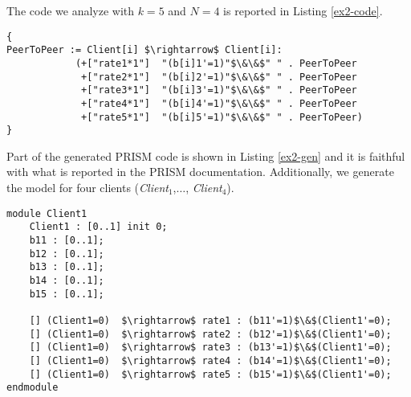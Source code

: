 The code we analyze with $k=5$ and $N=4$ is reported in Listing \ref{ex2-code}.
\begin{lstlisting}[style=chor-color,caption={Choreography for the Peer-To-Peer Protocol.},captionpos=b,label={ex2-code}]
{
PeerToPeer := Client[i] $\rightarrow$ Client[i]: 
			(+["rate1*1"]  "(b[i]1'=1)"$\&\&$" " . PeerToPeer
			 +["rate2*1"]  "(b[i]2'=1)"$\&\&$" " . PeerToPeer
			 +["rate3*1"]  "(b[i]3'=1)"$\&\&$" " . PeerToPeer
			 +["rate4*1"]  "(b[i]4'=1)"$\&\&$" " . PeerToPeer
			 +["rate5*1"]  "(b[i]5'=1)"$\&\&$" " . PeerToPeer)
}
\end{lstlisting} 

Part of the generated PRISM code is shown in Listing \ref{ex2-gen} and it is faithful with what is reported in the PRISM documentation. Additionally, we generate the model for four clients (\emph{Client$_1$},$\ldots$, \emph{Client$_4$}).
\begin{lstlisting}[style=prism-color,caption={Generated PRISM program for the Peer-To-Peer Protocol.},captionpos=b,label={ex2-gen}]
module Client1
	Client1 : [0..1] init 0;
	b11 : [0..1]; 
	b12 : [0..1]; 
	b13 : [0..1]; 
	b14 : [0..1]; 
	b15 : [0..1]; 

	[] (Client1=0)  $\rightarrow$ rate1 : (b11'=1)$\&$(Client1'=0); 
	[] (Client1=0)  $\rightarrow$ rate2 : (b12'=1)$\&$(Client1'=0); 
	[] (Client1=0)  $\rightarrow$ rate3 : (b13'=1)$\&$(Client1'=0); 
	[] (Client1=0)  $\rightarrow$ rate4 : (b14'=1)$\&$(Client1'=0); 
	[] (Client1=0)  $\rightarrow$ rate5 : (b15'=1)$\&$(Client1'=0); 
endmodule
\end{lstlisting}


